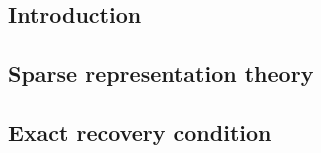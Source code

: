 \subsection{Introduction}


\subsection{Sparse representation theory}
\label{sec:Sparse_representation}


\subsection{Exact recovery condition}
\label{sec:Exact_recovery_condition} 
